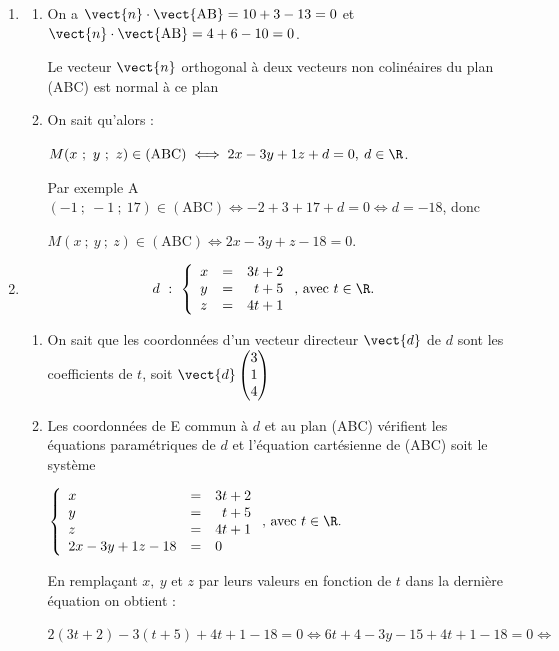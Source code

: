 \begin{enumerate}[resume]
	\item 
	\begin{enumerate}
		\item 
On a $\vect{n} \cdot \vect{\text{AB}} = 10  + 3 - 13 = 0$ et  $\vect{n} \cdot \vect{\text{AB}} = 4  + 6 - 10 = 0$.

Le vecteur $\vect{n}$ orthogonal à deux vecteurs non colinéaires du plan (ABC) est normal à ce plan
		\item 
On sait qu'alors :
		
$M(x~;~y~;~z) \in  (\text{ABC}) \iff 2x - 3y + 1z + d = 0, \: d \in \R$.
		
Par exemple A$(-1~;~-1~;~17)\in (\text{ABC}) \iff - 2 + 3 + 17 + d = 0 \iff d = -18$, donc 

$M(x~;~y~;~z) \in  (\text{ABC}) \iff 2x - 3y + z - 18 = 0$.
\end{enumerate}
	\item 

\[ d~:~\left\{\begin{array}{l c l}
x&=&3t+2\\y&=&\phantom{3}t+5\\z&=&4t+1\end{array}\right.\text{, avec } t \in \R. \]
	\begin{enumerate}
		\item 
On sait que les coordonnées d'un vecteur directeur $\vect{d}$ de $d$ sont les coefficients de $t$, soit $\vect{d}\begin{pmatrix}3\\1\\4\end{pmatrix}$
		\item 
		Les coordonnées de E commun à $d$ et au plan (ABC) vérifient les équations paramétriques de $d$ et l'équation cartésienne de (ABC) soit le système
		
		$\left\{\begin{array}{l c l}
x&=&3t+2\\y&=&\phantom{3}t+5\\z&=&4t+1\\
2x - 3y + 1z - 18 &=& 0
\end{array}\right.\text{, avec } t \in \R.$

En remplaçant $x, \:y$ et $z$ par leurs valeurs en fonction de $t$ dans la dernière équation on obtient :

$2(3t + 2)- 3(t + 5) + 4t + 1 - 18 = 0 \iff 6t + 4 - 3y - 15 + 4t + 1 - 18 = 0\iff $


\end{enumerate}
\end{enumerate}
